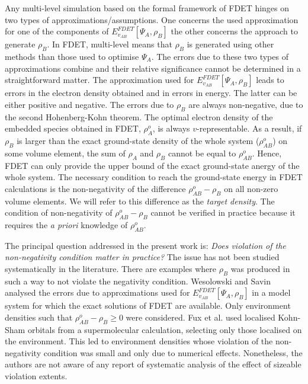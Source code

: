 \documentclass[amsmath,amssymb,preprint,aip,jcp]{revtex4-1}
\begin{document}
Any multi-level simulation based on the formal framework of FDET
hinges on two types of approximations/assumptions.
One concerns the used approximation for one of the components of ${E}_{v_{AB}}^{FDET}[\Psi_{A},\rho_B]$ the other concerns the approach to generate $\rho_B$. In FDET, multi-level means that $\rho_B$ is generated using other methods than those used to optimise $\Psi_A$. The errors due to these two types of approximations combine and their relative significance cannot be determined in a straightforward matter. The approximation used for ${E}_{v_{AB}}^{FDET}[\Psi_{A},\rho_B]$ leads to errors in the electron density obtained and in errors in energy. The latter can be either positive and negative. The errors due to $\rho_B$ are always non-negative, due to the second Hohenberg-Kohn theorem.
The optimal electron density of the embedded species obtained in FDET, $\rho_A^o$, is always $v$-representable. 
As a result, if $\rho_B$
is larger than the exact ground-state density of the whole system ($\rho_{AB}^o$) on some volume element, the sum of $\rho_A$ and
$\rho_B$ cannot be equal to $\rho_{AB}^o$. Hence, FDET can only provide the upper bound of the exact ground-state anergy of the whole system. The necessary condition to reach the ground-state energy in FDET calculations is the non-negativity of the difference $\rho_{AB}^o-\rho_B$ on all non-zero volume elements.
We will refer to this difference as the {\it target density}.
The condition of non-negativity of $\rho_{AB}^o-\rho_B$ cannot be verified in practice because it requires the {\it a priori} knowledge of 
$\rho_{AB}^o$.

The principal question addressed in the present work is: {\it Does violation of the non-negativity condition matter in practice?} 
The issue has not been studied systematically in the literature.
 There are examples where $\rho_B$ was produced in such a way to not violate the negativity condition. 
Wesolowski and Savin analysed the errors due to approximations used for ${E}_{v_{AB}}^{FDET}[\Psi_{A},\rho_B]$ in a model system for which the exact solutions of FDET are available. Only environment densities such that $\rho_{AB}^o-\rho_B \geq 0$ were considered. \cite{Wesolowski2013}
Fux et al. \cite{Fux2010} used localised Kohn-Sham orbitals from a supermolecular calculation, selecting only those localised on the environment. This led to environment densities whose violation of the non-negativity condition was small and only due to numerical effects. Nonetheless, the authors are not aware of any report of systematic analysis of the effect of sizeable violation extents.
\end{document}
